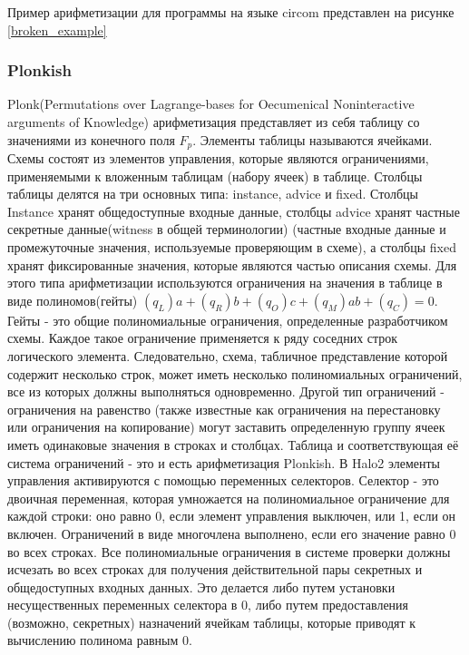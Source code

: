 \documentclass[a4paper]{article}
\begin{document}
Пример арифметизации для программы на языке circom представлен на рисунке \ref{broken_example}

\subsubsection{Plonkish}
\indent

Plonk(Permutations over Lagrange-bases for
Oecumenical Noninteractive arguments of
Knowledge) арифметизация представляет из себя таблицу со значениями из конечного поля $F_p$. Элементы таблицы называются ячейками. Схемы состоят из элементов управления, которые являются ограничениями, применяемыми к вложенным таблицам (набору ячеек) в таблице. Столбцы таблицы делятся на три основных типа: instance, advice и fixed.
Столбцы Instance хранят общедоступные входные данные, столбцы advice хранят частные секретные данные(witness в общей терминологии) (частные входные данные и промежуточные значения, используемые проверяющим в схеме), а столбцы fixed хранят фиксированные значения, которые являются частью описания схемы. Для этого типа арифметизации используются ограничения на значения в таблице в виде полиномов(гейты) $(q_L)a+(q_R)b+(q_O)c+(q_M)ab+(q_C)=0$. Гейты - это общие полиномиальные ограничения, определенные разработчиком схемы. Каждое такое ограничение применяется к ряду соседних строк логического элемента. Следовательно, схема, табличное представление которой содержит несколько строк, может иметь несколько полиномиальных ограничений, все из которых должны выполняться одновременно. Другой тип ограничений - ограничения на равенство (также известные как ограничения на перестановку или ограничения на копирование) могут заставить определенную группу ячеек иметь одинаковые значения в строках и столбцах.
Таблица и соответствующая её система ограничений - это и есть арифметизация Plonkish.
В Halo2 элементы управления активируются с помощью переменных селекторов. Селектор - это двоичная
переменная, которая умножается на полиномиальное ограничение для каждой строки: оно равно 0, если элемент управления выключен, или 1, если он включен.
Ограничений в виде многочлена выполнено, если его значение равно 0 во всех строках. Все полиномиальные ограничения в системе проверки должны исчезать во всех строках для получения действительной пары секретных и общедоступных входных данных.
Это делается либо путем установки несущественных переменных селектора в 0, либо путем предоставления (возможно, секретных) назначений ячейкам таблицы, которые приводят к вычислению полинома равным 0.
\end{document}
